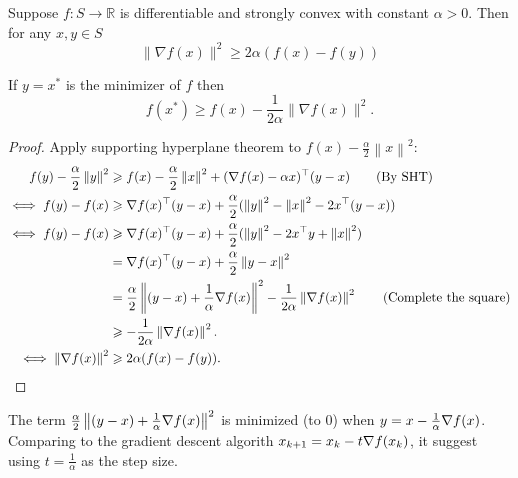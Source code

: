 \begin{theorem}\label{thm:lower_bound_gradient}
    Suppose $f: S \rightarrow \mathbb{R}$ is differentiable and strongly convex with constant $\alpha>0$. Then for any $x, y \in S$
    \[
    \|\nabla f(x)\|^2 \geq 2 \alpha(f(x)-f(y))
    \]
\end{theorem}
\begin{note}
    If $y=x^*$ is the minimizer of $f$ then
\[
f\left(x^*\right) \geq f(x)-\frac{1}{2 \alpha}\|\nabla f(x)\|^2 .
\]
\end{note}
\begin{proof}
    Apply supporting hyperplane theorem to $ f(x)-\frac{\alpha}{2} \left\| x \right\|^2 $: 
    \begin{align*}
        f(y) - \frac{\alpha}{2}\left\| y \right\|^2 &\geqslant f(x) - \frac{\alpha}{2} \left\| x \right\|^2 + (\nabla f(x) - \alpha x)^\top (y-x)\tag{By SHT}\\ 
        \iff f(y)-f(x)&\geqslant \nabla f(x)^\top(y-x) + \frac{\alpha}{2}(\left\| y \right\|^2 - \left\| x \right\|^2 - 2 x^\top(y-x))\\ 
        \iff f(y)-f(x)&\geqslant \nabla f(x)^\top(y-x) + \frac{\alpha}{2}(\left\| y \right\|^2 - 2 x^\top y + \left\| x \right\|^2)\\ 
        &= \nabla f(x)^\top(y-x) + \frac{\alpha}{2}\left\| y-x \right\|^2\\ 
        & = \frac{\alpha}{2}\left\| (y-x)+\frac{1}{\alpha}\nabla f(x) \right\|^2-\frac{1}{2\alpha}\left\| \nabla f(x) \right\|^2 \tag{Complete the square}\\ 
        &\geqslant -\frac{1}{2\alpha}\left\| \nabla f(x) \right\|^2.\\
        \iff \left\| \nabla f(x) \right\|^2 &\geqslant 2\alpha (f(x)-f(y)).\qedhere
    \end{align*}
\end{proof}
\begin{remark}
    The term $ \frac{\alpha}{2}\left\| (y-x)+\frac{1}{\alpha}\nabla f(x) \right\|^2 $ is minimized (to 0) when $ y = x - \frac{1}{\alpha} \nabla f(x) $. Comparing to the gradient descent algorith $ x_{k+1} = x_k - t \nabla f(x_k) $, it suggest using $ t = \frac{1}{\alpha} $ as the step size. 
\end{remark}